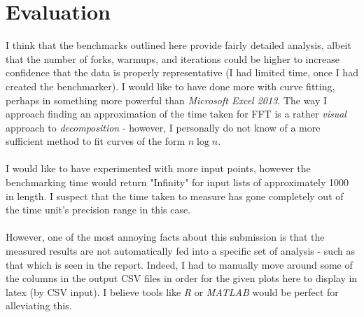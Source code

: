 \documentclass[]{article}
\begin{document}
\section{Evaluation}
I think that the benchmarks outlined here provide fairly detailed analysis, albeit that the number of forks, warmups, and iterations could be higher to increase confidence that the data is properly representative (I had limited time, once I had created the benchmarker). I would like to have done more with curve fitting, perhaps in something more powerful than \emph{Microsoft Excel 2013}. The way I approach finding an approximation of the time taken for FFT is a rather \emph{visual} approach to \emph{decomposition} - however, I personally do not know of a more sufficient method to fit curves of the form $n\log{n}$.
\\\\
I would like to have experimented with more input points, however the benchmarking time would return "Infinity" for input lists of approximately 1000 in length. I suspect that the time taken to measure has gone completely out of the time unit's precision range in this case.
\\\\
However, one of the most annoying facts about this submission is that the measured results are not automatically fed into a specific set of analysis - such as that which is seen in the report. Indeed, I had to manually move around some of the columns in the output CSV files in order for the given plots here to display in latex (by CSV input). I believe tools like \emph{R} or \emph{MATLAB} would be perfect for alleviating this.


\end{document}
